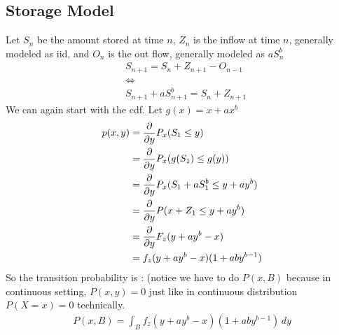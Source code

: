 \subsection{Storage Model} 
Let $S_n$ be the amount stored at time $n$, $Z_n$ is the inflow at time $n$, generally modeled as iid, and $O_n$ is the out flow, generally modeled as $a S_n^b$
    \begin{align*}
        & S_{n+1} = S_n + Z_{n+1} - O_{n-1} \tag{New = Old + In - Out}  \\
        & \Longleftrightarrow \\
        & S_{n+1} + a S_{n+1}^b = S_n + Z_{n+1} 
    \end{align*}
We can again start with the cdf. Let $g(x) = x + ax^b$
    \begin{align*}
        p(x,y) 
        & = \frac{\partial}{\partial y}P_x(S_1 \leq y) \\
        & = \frac{\partial}{\partial y} P_x(g(S_1) \leq g(y)) \\
        & = \frac{\partial}{\partial y} P_x(S_1 + a S_1^b \leq y + ay^b) \\
        & = \frac{\partial}{\partial y} P(x + Z_1 \leq y + ay^b)\\
        & = \frac{\partial}{\partial y} F_z(y + ay^b - x)\\
        & = f_z(y + ay^b - x) (1 + aby^{b-1})
    \end{align*}
So the transition probability is : (notice we have to do $P(x,B)$ because in continuous setting, $P(x,y)=0$ just like in continuous distribution $P(X=x)=0$ technically. 
    \begin{align*}
        P(x, B) = \int_B f_z(y + ay^b - x) (1 + aby^{b-1}) \, dy
    \end{align*}
    
